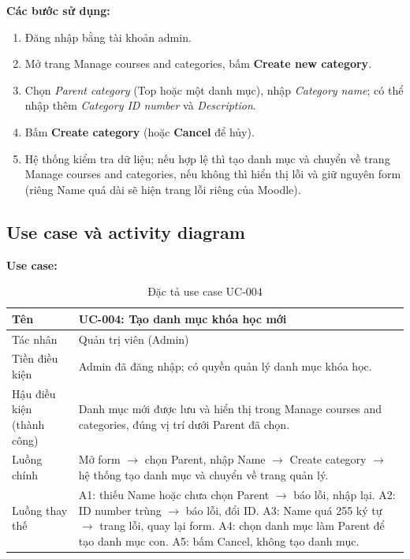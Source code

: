\documentclass[12pt,a4paper]{article}
\begin{document}
\textbf{Các bước sử dụng:}
\begin{enumerate}[noitemsep]
  \item Đăng nhập bằng tài khoản admin.
  \item Mở trang Manage courses and categories, bấm \textbf{Create new category}.
  \item Chọn \textit{Parent category} (Top hoặc một danh mục), nhập \textit{Category name}; có thể nhập thêm \textit{Category ID number} và \textit{Description}.
  \item Bấm \textbf{Create category} (hoặc \textbf{Cancel} để hủy).
  \item Hệ thống kiểm tra dữ liệu; nếu hợp lệ thì tạo danh mục và chuyển về trang Manage courses and categories, nếu không thì hiển thị lỗi và
        giữ nguyên form (riêng Name quá dài sẽ hiện trang lỗi riêng của Moodle).
\end{enumerate}

\subsection{Use case và activity diagram}
\textbf{Use case:}
\begin{table}[H]
\centering\small
\begin{tabular}{|L{3.6cm}|L{11.4cm}|}
\hline
Tên & UC-004: Tạo danh mục khóa học mới \\ \hline
Tác nhân & Quản trị viên (Admin) \\ \hline
Tiền điều kiện & Admin đã đăng nhập; có quyền quản lý danh mục khóa học. \\ \hline
Hậu điều kiện (thành công) & Danh mục mới được lưu và hiển thị trong Manage courses and categories, đúng vị trí dưới Parent đã chọn. \\ \hline
Luồng chính & Mở form $\rightarrow$ chọn Parent, nhập Name $\rightarrow$ Create category $\rightarrow$ hệ thống tạo danh mục và chuyển về trang quản lý. \\ \hline
Luồng thay thế & A1: thiếu Name hoặc chưa chọn Parent $\rightarrow$ báo lỗi, nhập lại. A2: ID number trùng $\rightarrow$ báo lỗi, đổi ID.
A3: Name quá 255 ký tự $\rightarrow$ trang lỗi, quay lại form. A4: chọn danh mục làm Parent để tạo danh mục con. A5: bấm Cancel, không tạo danh mục. \\ \hline
\end{tabular}
\caption{Đặc tả use case UC-004}
\end{table}
\end{document}
